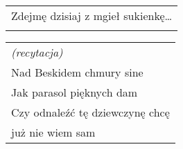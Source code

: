 \documentclass[a5paper]{article}
\begin{document}
\noindent
\begin{tabular}{@{}p{5.50cm}@{}}
Zdejmę dzisiaj z mgieł sukienkę… \\ \\
\end{tabular}

\noindent
\begin{tabular}{@{}p{6.50cm}@{}}
\emph{(recytacja)} \\
Nad Beskidem chmury sine \\
Jak parasol pięknych dam \\
Czy odnaleźć tę dziewczynę chcę \\
już nie wiem sam
\end{tabular}
\end{document}
